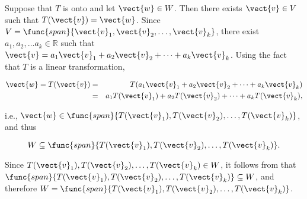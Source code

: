 \begin{solution}
Suppose that $T$ is onto and let $\vect{w}\in W$.  
Then there exists $\vect{v}\in V$ such that $T(\vect{v})=\vect{w}$.
Since $V=\func{span}\{\vect{v}_1, \vect{v}_2, \ldots, \vect{v}_k\}$, there
exist $a_1, a_2, \ldots a_k\in\mathbb{R}$ such that 
$\vect{v} = a_1\vect{v}_1 + a_2\vect{v}_2 + \cdots + a_k\vect{v}_k$.
Using the fact that $T$ is a linear transformation,

\begin{eqnarray*}
\vect{w}=T(\vect{v})
& = & T(a_1\vect{v}_1 + a_2\vect{v}_2 + \cdots + a_k\vect{v}_k) \\
& = & a_1T(\vect{v}_1) + a_2T(\vect{v}_2) + \cdots + a_kT(\vect{v}_k),
\end{eqnarray*}

i.e., $\vect{w}\in\func{span}\{T(\vect{v}_1), T(\vect{v}_2), \ldots, T(\vect{v}_k)\}$,
and thus 

\[ W\subseteq \func{span}\{T(\vect{v}_1), T(\vect{v}_2), \ldots, T(\vect{v}_k)\}.\]

Since $T(\vect{v}_1), T(\vect{v}_2), \ldots, T(\vect{v}_k)\in W$, 
it follows from
that
$\func{span}\{T(\vect{v}_1), T(\vect{v}_2), \ldots, T(\vect{v}_k)\}\subseteq W$,
and therefore
$W=\func{span}\{T(\vect{v}_1), T(\vect{v}_2), \ldots, T(\vect{v}_k)\}$.
\end{solution}
